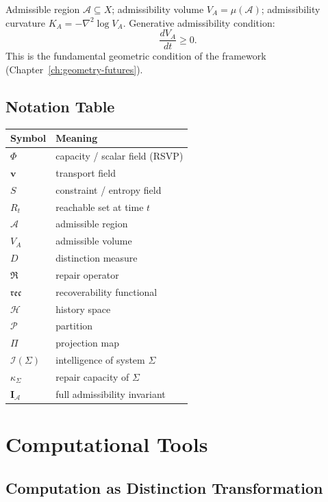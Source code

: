 \documentclass[12pt,twoside,openright]{book}
\newcommand{\partition}{\mathcal{P}}
\newcommand{\hist}{\mathcal{H}}
\newcommand{\adm}{\mathcal{A}}
\newcommand{\repair}{\mathfrak{R}}
\newcommand{\reco}{\mathfrak{rec}}
\begin{document}
Admissible region $\adm \subseteq X$;
admissibility volume $V_A = \mu(\adm)$;
admissibility curvature $K_A = -\nabla^2\log V_A$.
Generative admissibility condition:
\[
  \frac{dV_A}{dt} \ge 0.
\]
This is the fundamental geometric condition of the
framework (Chapter~\ref{ch:geometry-futures}).

\section{Notation Table}

\begin{center}
\begin{tabular}{ll}
\toprule
Symbol & Meaning \\
\midrule
$\Phi$ & capacity / scalar field (RSVP) \\
$\mathbf{v}$ & transport field \\
$S$ & constraint / entropy field \\
$R_t$ & reachable set at time $t$ \\
$\adm$ & admissible region \\
$V_A$ & admissible volume \\
$D$ & distinction measure \\
$\repair$ & repair operator \\
$\reco$ & recoverability functional \\
$\hist$ & history space \\
$\partition$ & partition \\
$\Pi$ & projection map \\
$\mathcal{I}(\Sigma)$ & intelligence of system $\Sigma$ \\
$\kappa_\Sigma$ & repair capacity of $\Sigma$ \\
$\mathbf{I}_\adm$ & full admissibility invariant \\
\bottomrule
\end{tabular}
\end{center}

\chapter{Computational Tools}
\label{app:comp}

\section{Computation as Distinction Transformation}
\end{document}
